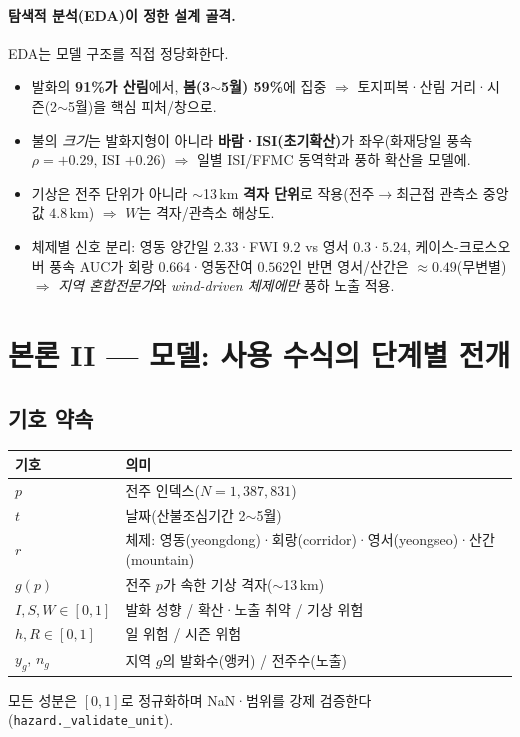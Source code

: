 \documentclass[11pt,a4paper]{article}
\newcommand{\src}[1]{{\footnotesize\color{gray}\texttt{#1}}}
\begin{document}
\paragraph{탐색적 분석(EDA)이 정한 설계 골격.} EDA는 모델 구조를 직접 정당화한다.
\begin{itemize}[leftmargin=1.4em,itemsep=1pt]
\item 발화의 \textbf{91\%가 산림}에서, \textbf{봄(3$\sim$5월) 59\%}에 집중 $\Rightarrow$ 토지피복·산림
거리·시즌(2$\sim$5월)을 핵심 피처/창으로.
\item 불의 \emph{크기}는 발화지형이 아니라 \textbf{바람·ISI(초기확산)}가 좌우(화재당일 풍속
$\rho{=}{+}0.29$, ISI ${+}0.26$) $\Rightarrow$ 일별 ISI/FFMC 동역학과 풍하 확산을 모델에.
\item 기상은 전주 단위가 아니라 $\sim$13\,km \textbf{격자 단위}로 작용(전주$\to$최근접 관측소 중앙값
$4.8$\,km) $\Rightarrow$ $W$는 격자/관측소 해상도.
\item 체제별 신호 분리: 영동 양간일 $2.33$·FWI $9.2$ vs 영서 $0.3$·$5.24$, 케이스-크로스오버 풍속
AUC가 회랑 $0.664$·영동잔여 $0.562$인 반면 영서/산간은 $\approx 0.49$(무변별)
$\Rightarrow$ \emph{지역 혼합전문가}와 \emph{wind-driven 체제에만} 풍하 노출 적용.
\end{itemize}

\section{본론 II — 모델: 사용 수식의 단계별 전개}

\subsection{기호 약속}
\begin{center}
\small
\begin{tabular}{ll}
\toprule
기호 & 의미 \\
\midrule
$p$ & 전주 인덱스($N=1{,}387{,}831$) \\
$t$ & 날짜(산불조심기간 2$\sim$5월) \\
$r$ & 체제: 영동(yeongdong)·회랑(corridor)·영서(yeongseo)·산간(mountain) \\
$g(p)$ & 전주 $p$가 속한 기상 격자($\sim$13\,km) \\
$I,S,W\in[0,1]$ & 발화 성향 / 확산·노출 취약 / 기상 위험 \\
$h,R\in[0,1]$ & 일 위험 / 시즌 위험 \\
$y_g,\,n_g$ & 지역 $g$의 발화수(앵커) / 전주수(노출) \\
\bottomrule
\end{tabular}
\end{center}
모든 성분은 $[0,1]$로 정규화하며 NaN·범위를 강제 검증한다(\src{hazard.\_validate\_unit}).
\end{document}
